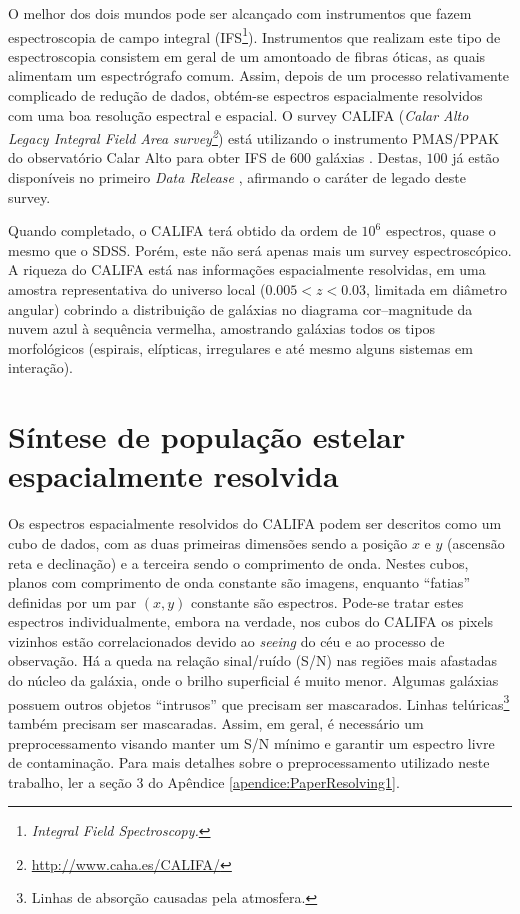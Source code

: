O melhor dos dois mundos pode ser alcançado com instrumentos que fazem
espectroscopia de campo integral (IFS\footnote{\em Integral Field
Spectroscopy.}). Instrumentos que realizam este tipo de espectroscopia consistem
em geral de um amontoado de fibras óticas, as quais alimentam um espectrógrafo
comum. Assim, depois de um processo relativamente complicado de redução de
dados, obtém-se espectros espacialmente resolvidos com uma boa resolução
espectral e espacial. O survey CALIFA ({\em Calar Alto Legacy Integral Field
Area survey\footnote{\url{http://www.caha.es/CALIFA/}}}) está utilizando o
instrumento PMAS/PPAK do observatório Calar Alto para obter IFS de $600$
galáxias \citep{Sanchez2012}.
Destas, $100$ já estão disponíveis no primeiro {\em Data Release}
\citep[DR1]{Husemann2013}, afirmando o caráter de legado deste survey.

Quando completado, o CALIFA terá obtido da ordem de $10^6$ espectros, quase o
mesmo que o SDSS. Porém, este não será apenas mais um survey espectroscópico. A
riqueza do CALIFA está nas informações espacialmente resolvidas, em uma amostra
representativa do universo local ($0.005 < z < 0.03$, limitada em diâmetro
angular) cobrindo a distribuição de galáxias no diagrama cor--magnitude da nuvem
azul à sequência vermelha, amostrando galáxias todos os tipos morfológicos
(espirais, elípticas, irregulares e até mesmo alguns sistemas em interação).



\section{Síntese de população estelar espacialmente resolvida}
\label{sec:Intro:Sintese}

Os espectros espacialmente resolvidos do CALIFA podem ser descritos como um cubo
de dados, com as duas primeiras dimensões sendo a posição $x$ e $y$ (ascensão
reta e declinação) e a terceira sendo o comprimento de onda. Nestes cubos,
planos com comprimento de onda constante são imagens, enquanto ``fatias''
definidas por um par $(x, y)$ constante são espectros. Pode-se tratar estes
espectros individualmente, embora na verdade, nos cubos do CALIFA os pixels
vizinhos estão correlacionados devido ao {\em seeing} do céu e ao processo de
observação. Há a queda na relação sinal/ruído (S/N) nas regiões mais
afastadas do núcleo da galáxia, onde o brilho superficial é muito menor.
Algumas galáxias possuem outros objetos ``intrusos'' que precisam ser
mascarados. Linhas telúricas\footnote{Linhas de absorção causadas pela
atmosfera.} também precisam ser mascaradas. Assim, em geral, é necessário um
preprocessamento visando manter um S/N mínimo e garantir um espectro livre de
contaminação. Para mais detalhes sobre o preprocessamento utilizado neste
trabalho, ler a seção 3 do Apêndice \ref{apendice:PaperResolving1}.

